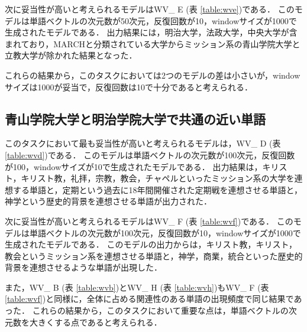 次に妥当性が高いと考えられるモデルはWV\_ E (表 \ref{table:wve})である．
このモデルは単語ベクトルの次元数が50次元，反復回数が10，windowサイズが1000で生成されたモデルである．
出力結果には，明治大学，法政大学，中央大学が含まれており，MARCHと分類されている大学からミッション系の青山学院大学と立教大学が除かれた結果となった．

これらの結果から，このタスクにおいては2つのモデルの差は小さいが，windowサイズは1000が妥当で，反復回数は10で十分であると考えられる．

\subsection{青山学院大学と明治学院大学で共通の近い単語}
このタスクにおいて最も妥当性が高いと考えられるモデルは，WV\_ D (表 \ref{table:wvd})である．
このモデルは単語ベクトルの次元数が100次元，反復回数が100，windowサイズが10で生成されたモデルである．
出力結果は，キリスト，キリスト教，礼拝，宗教，教会，チャペルといったミッション系の大学を連想する単語と，定期という過去に18年間開催された定期戦を連想させる単語と，神学という歴史的背景を連想させる単語が出力された．

次に妥当性が高いと考えられるモデルはWV\_ F (表 \ref{table:wvf})である．
このモデルは単語ベクトルの次元数が100次元，反復回数が10，windowサイズが1000で生成されたモデルである．
このモデルの出力からは，キリスト教，キリスト，教会というミッション系を連想させる単語と，神学，商業，統合といった歴史的背景を連想させるような単語が出現した．

また，WV\_ B (表 \ref{table:wvb})とWV\_ H (表 \ref{table:wvh})もWV\_ F (表 \ref{table:wvf})と同様に，全体に占める関連性のある単語の出現頻度で同じ結果であった．
これらの結果から，このタスクにおいて重要な点は，単語ベクトルの次元数を大きくする点であると考えられる．

